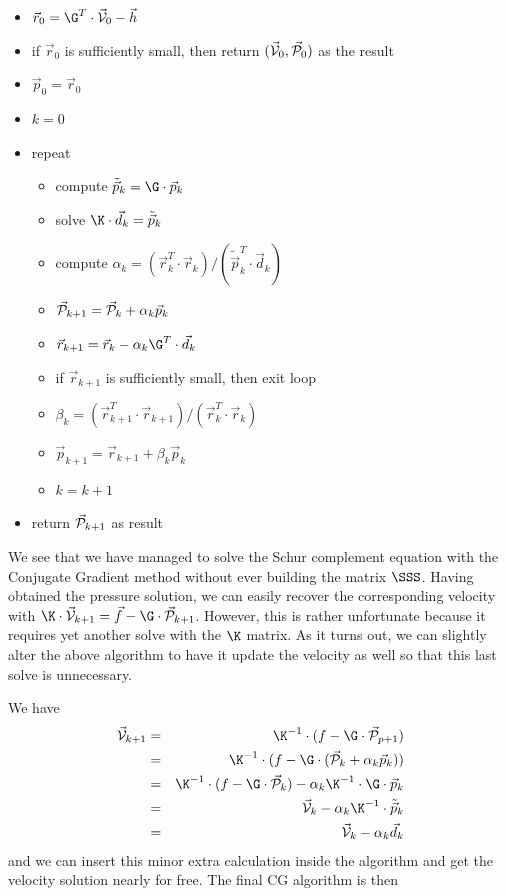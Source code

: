 \begin{itemize}
\item $\vec{r}_0 = \G^T\cdot \vec{\cal V}_0 - \vec{h}$ 
\item if $\vec{r}_0$ is sufficiently small, then return $(\vec{\cal V}_0,\vec{\cal P}_0)$ as the result
\item $\vec{p}_0=\vec{r}_0$
\item $k=0$
\item repeat
\begin{itemize}
\item compute $\tilde{\vec{p}}_k = \G\cdot \vec{p}_k$
\item solve $\K\cdot  \vec{d}_k = \tilde{\vec{p}}_k$
\item compute $\alpha_k=(\vec{r}_k^T \cdot  \vec{r}_k)/(\tilde{\vec{p}}_k^T\cdot  \vec{d}_k)$
\item $\vec{\cal P}_{k+1} = \vec{\cal P}_k+\alpha_k \vec{p}_k$
\item $\vec{r}_{k+1} = \vec{r}_k - \alpha_k \G^T \cdot \vec{d}_k $
\item if $\vec{r}_{k+1}$ is sufficiently small, then exit loop
\item $\beta_k=(\vec{r}_{k+1}^T \cdot \vec{r}_{k+1})/(\vec{r}_k^T \cdot \vec{r}_k)$
\item $\vec{p}_{k+1} =\vec{r}_{k+1}+ \beta_k \vec{p}_k$
\item $k=k+1$
\end{itemize}
\item return $\vec{\cal P}_{k+1}$ as result
\end{itemize}
We see that we have managed to solve the Schur complement equation with the Conjugate Gradient method
without ever building the matrix $\SSS$. Having obtained the pressure solution, we can easily recover 
the corresponding velocity with $\K\cdot \vec{\cal V}_{k+1} =\vec{f}- \G\cdot \vec{\cal P}_{k+1}$. 
However, this is rather unfortunate because it requires yet another solve with the $\K$ matrix. 
As it turns out, we can slightly alter the above algorithm to have it update the velocity 
as well so that this last solve is unnecessary.

We have 
\begin{eqnarray}
\vec{\cal V}_{k+1} 
&=& \K^{-1}\cdot (f - \G\cdot \vec{\cal P}_{p+1} )\\
&=& \K^{-1}\cdot (f - \G\cdot (\vec{\cal P}_k+\alpha_k \vec{p}_k) ) \\
&=& \K^{-1}\cdot (f - \G\cdot \vec{\cal P}_k) - \alpha_k \K^{-1}\cdot \G \cdot \vec{p}_k \\
&=& \vec{\cal V}_k - \alpha_k \K^{-1}\cdot \tilde{\vec{p}}_k  \\
&=& \vec{\cal V}_k - \alpha_k \vec{d}_k 
\end{eqnarray}
and we can insert this minor extra calculation inside the algorithm and get the velocity solution 
nearly for free. The final CG algorithm is then 

